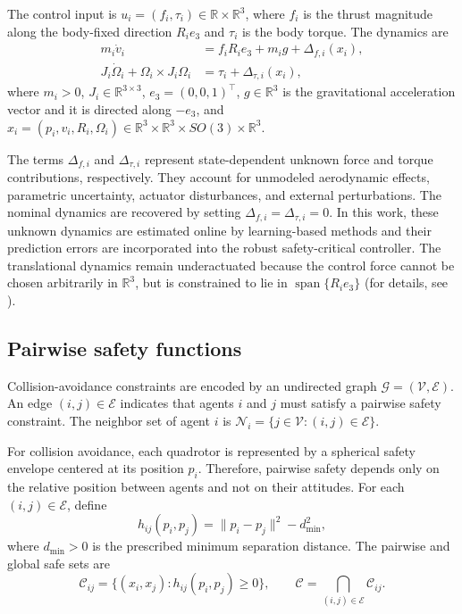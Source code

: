 \documentclass[journal,twoside,web]{ieeecolor}
\begin{document}
The control input is $u_i=(f_i,\tau_i)\in\mathbb R\times
\mathbb R^3$, where $f_i$ is the thrust magnitude along the
body-fixed direction $R_ie_3$ and $\tau_i$ is the body torque.
The dynamics are
\begin{align}
    m_i\dot v_i
    &=
    f_iR_ie_3+m_i g+\Delta_{f,i}(x_i),
    \label{eq:trans_dyn}
    \\
    J_i\dot\Omega_i+\Omega_i\times J_i\Omega_i
    &=
    \tau_i+\Delta_{\tau,i}(x_i),
    \label{eq:rot_dyn}
\end{align}
where $m_i>0$, $J_i\in\mathbb R^{3\times3}$,
$e_3=(0,0,1)^\top$, $g\in\mathbb R^3$ is the gravitational
acceleration vector and it is directed along $-e_{3}$, and
$ x_i=(p_i,v_i,R_i,\Omega_i)\in
    \mathbb R^3\times\mathbb R^3\times SO(3)\times\mathbb R^3$.

The terms $\Delta_{f,i}$ and $\Delta_{\tau,i}$ represent
state-dependent unknown force and torque contributions, respectively.
They account for unmodeled aerodynamic effects, parametric uncertainty,
actuator disturbances, and external perturbations. The nominal dynamics
are recovered by setting $\Delta_{f,i}=\Delta_{\tau,i}=0$. In this work,
these unknown dynamics are estimated online by learning-based methods and
their prediction errors are incorporated into the robust safety-critical
controller. The translational dynamics remain underactuated because the
control force cannot be chosen arbitrarily in $\mathbb R^3$, but is
constrained to lie in $\operatorname{span}\{R_i e_3\}$ (for details, see \cite{lee2010geometric}).
\subsection{Pairwise safety functions}

Collision-avoidance constraints are encoded by an undirected
graph $\mathcal G=(\mathcal V,\mathcal E)$. An edge
$(i,j)\in\mathcal E$ indicates that agents $i$ and $j$ must
satisfy a pairwise safety constraint. The neighbor set of agent
$i$ is $\mathcal N_i=\{j\in\mathcal V:(i,j)\in\mathcal E\}$.

For collision avoidance, each quadrotor is represented by a
spherical safety envelope centered at its position $p_i$.
Therefore, pairwise safety depends only on the relative
position between agents and not on their attitudes. For each
$(i,j)\in\mathcal E$, define
\begin{equation}
    h_{ij}(p_i,p_j)
    =
    \|p_i-p_j\|^2-d_{\min}^2,
    \label{eq:pairwise_safety_function}
\end{equation}
where $d_{\min}>0$ is the prescribed minimum separation
distance. The pairwise and global safe sets are
\begin{equation}
    \mathcal C_{ij}
    =
    \{(x_i,x_j):h_{ij}(p_i,p_j)\geq0\},
    \qquad
    \mathcal C
    =
    \bigcap_{(i,j)\in\mathcal E}\mathcal C_{ij}.
    \label{eq:safe_sets}
\end{equation}
\end{document}
